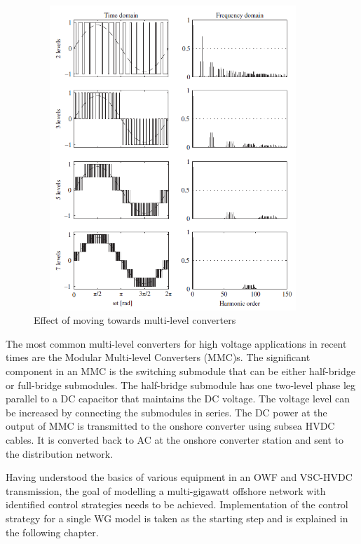 \begin{figure}[H]
\centering
    \includegraphics[height = 11.5cm,width = 10.5cm]{Diagrams/Chapter_2/2levelVSCtoMMC.PNG}
    \caption{Effect of moving towards multi-level converters \cite{sharifabadi2016design}}
    \label{fig:2levelVSCtoMMC}
\end{figure}

The most common multi-level converters for high voltage applications in recent times are the Modular Multi-level Converters (\gls{MMC})s. The significant component in an \gls{MMC} is the switching submodule that can be either half-bridge or full-bridge submodules. The half-bridge submodule has one two-level phase leg parallel to a \gls{DC} capacitor that maintains the \gls{DC} voltage. The voltage level can be increased by connecting the submodules in series. The \gls{DC} power at the output of \gls{MMC} is transmitted to the onshore converter using subsea \gls{HVDC} cables. It is converted back to \gls{AC} at the onshore converter station and sent to the distribution network.

Having understood the basics of various equipment in an \gls{OWF} and \gls{VSC}-\gls{HVDC} transmission, the goal of modelling a multi-gigawatt offshore network with identified control strategies needs to be achieved. Implementation of the control strategy for a single \gls{WG} model is taken as the starting step and is explained in the following chapter. 
